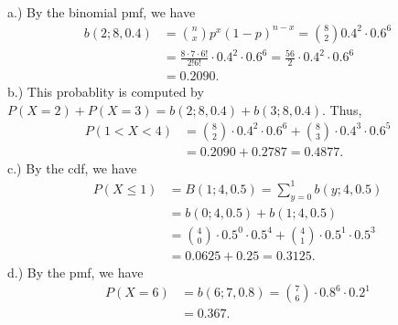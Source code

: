 \documentclass{report}
\begin{document}
 \bigbreak \noindent 
 a.) By the binomial pmf, we have
 \begin{align*}
     b(2;8, 0.4) &= \binom{n}{x}p^{x}(1-p)^{n-x} = \binom{8}{2}0.4^{2} \cdot 0.6^{6} \\
     &= \frac{8 \cdot 7 \cdot 6!}{2!6!}\cdot 0.4^{2} \cdot 0.6^{6} = \frac{56}{2}\cdot 0.4^{2}\cdot 0.6^{6} \\
     &=0.2090
 .\end{align*}
 \bigbreak \noindent 
 b.) This probablity is computed by $P(X=2)  + P(X=3) = b(2;8,0.4) + b(3;8,0.4)$. Thus,
 \begin{align*}
     P(1 < X < 4) &=\binom{8}{2} \cdot 0.4^{2} \cdot 0.6^{6} + \binom{8}{3}\cdot 0.4^{3} \cdot 0.6^{5} \\
     &=0.2090 + 0.2787 = 0.4877
 .\end{align*}
 \bigbreak \noindent 
 c.) By the cdf, we have
 \begin{align*}
     P(X \leq 1) &= B(1;4,0.5)= \sum_{y=0}^{1} b(y;4,0.5) \\
                 &=b(0;4,0.5) + b(1;4,0.5) \\
                 &= \binom{4}{0} \cdot 0.5^{0} \cdot 0.5^{4} + \binom{4}{1}\cdot 0.5^{1} \cdot 0.5^{3} \\
                 &=0.0625+0.25 = 0.3125
 .\end{align*}
 \bigbreak \noindent 
 d.) By the pmf, we have
 \begin{align*}
     P(X=6) &= b(6;7,0.8) = \binom{7}{6}\cdot 0.8^{6} \cdot 0.2^{1} \\
     &=0.367
 .\end{align*}
 
\end{document}

